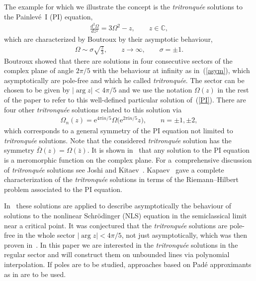 \documentclass[pdftex]{sigma}
\begin{document}
The example for which we illustrate the concept is the \emph{tritronqu\'ee} solutions to the Painlev\'e~I (PI) equation,
\begin{gather}
 \frac{d^{2}\Omega}{dz^{2}}=3\Omega^{2}-z, \qquad z\in \mathbb{C}, \label{PI}
\end{gather}
which are characterized by Boutroux \cite{BoutrouxI,Boutroux} by their asymptotic
behaviour,
\begin{gather}
 \Omega \sim \sigma \sqrt{\frac{z}{3}}, \qquad z\to\infty,\qquad \sigma=\pm1. \label{asym}
\end{gather}
Boutroux showed that there are solutions in four consecutive sectors of the complex plane of angle $2\pi/5$ with the behaviour at infinity as in~(\ref{asym}), which asymptotically are pole-free and which he called \emph{tritronqu\'ee}. The sector can be chosen to be given by $|\operatorname{arg}z|<4\pi/5$ and we use the notation $\Omega(z)$ in the rest of the paper to refer to this well-defined particular solution of~(\ref{PI}). There are four other \emph{tritronqu\'ee} solutions related to this solution via
\begin{gather*}
 \Omega_{n}(z)=\mathrm{e}^{4\pi\mathrm{i}n/5}\Omega\big(\mathrm{e}^{2\pi\mathrm{i}n/5}z\big) ,\qquad n=\pm1,\pm2, %
\end{gather*}
which corresponds to a general symmetry of the PI equation not limited to \emph{tritronqu\'ee} solutions. Note that the considered \emph{tritronqu\'ee} solution has the symmetry $\bar{\Omega}(z)=\Omega(\bar{z})$. It is shown in~\cite{ince} that any solution to the PI equation is a meromorphic function on the complex plane. For a~comprehensive discussion of \emph{tritronqu\'ee} solutions see Joshi and Kitaev~\cite{JK}. Kapaev~\cite{K1,K2,kap_p1_quasi} gave a complete characterization of the \emph{tritronqu\'ee} solutions in terms of the Riemann--Hilbert problem associated to the PI equation.

In~\cite{DubrovinGravaKlein} these solutions are applied to describe asymptotically the behaviour of solutions to the nonlinear Schr\"odinger (NLS) equation in the semiclassical limit near a critical point. It was conjectured that the \emph{tritronqu\'ee} solutions are pole-free in the whole sector $|\operatorname{arg}z|<4\pi/5$, not just asymptotically, which was then proven in~\cite{CHT}. In this paper we are interested in the \emph{tritronqu\'ee} solutions in the regular sector and will construct them on unbounded lines via polynomial interpolation. If poles are to be studied, approaches based on Pad\'e approximants as in \cite{FFW,FW, Nov} are to be used.
\end{document}

